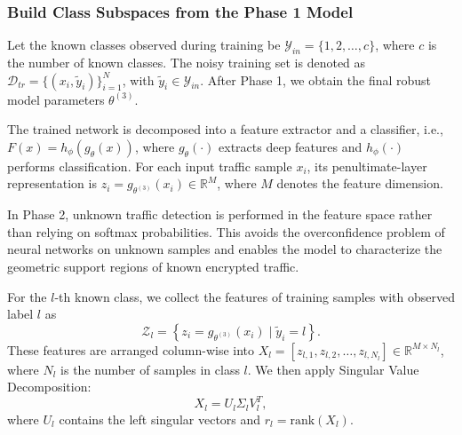 \documentclass{SCIS2026}
\begin{document}


\subsubsection{Build Class Subspaces from the Phase 1 Model}

Let the known classes observed during training be $\mathcal{Y}_{in}=\{1,2,\ldots,c\}$, where $c$ is the number of known classes. The noisy training set is denoted as $\mathcal{D}_{tr}=\{(x_i,\tilde{y}_i)\}_{i=1}^{N}$, with $\tilde{y}_i\in\mathcal{Y}_{in}$. After Phase 1, we obtain the final robust model parameters $\theta^{(3)}$.

The trained network is decomposed into a feature extractor and a classifier, i.e., $F(x)=h_{\phi}(g_{\theta}(x))$, where $g_{\theta}(\cdot)$ extracts deep features and $h_{\phi}(\cdot)$ performs classification. For each input traffic sample $x_i$, its penultimate-layer representation is $z_i=g_{\theta^{(3)}}(x_i)\in\mathbb{R}^{M}$, where $M$ denotes the feature dimension.

In Phase 2, unknown traffic detection is performed in the feature space rather than relying on softmax probabilities. This avoids the overconfidence problem of neural networks on unknown samples and enables the model to characterize the geometric support regions of known encrypted traffic.

For the $l$-th known class, we collect the features of training samples with observed label $l$ as
\begin{equation}
	\mathcal{Z}_{l}
	=
	\left\{
	z_i=g_{\theta^{(3)}}(x_i)
	\mid
	\tilde{y}_i=l
	\right\}.
\end{equation}
These features are arranged column-wise into $X_l=[z_{l,1},z_{l,2},\ldots,z_{l,N_l}]\in\mathbb{R}^{M\times N_l}$, where $N_l$ is the number of samples in class $l$. We then apply Singular Value Decomposition:
\begin{equation}
	X_l=U_l\Sigma_l V_l^{T},
\end{equation}
where $U_l$ contains the left singular vectors and $r_l=\mathrm{rank}(X_l)$.
\end{document}
